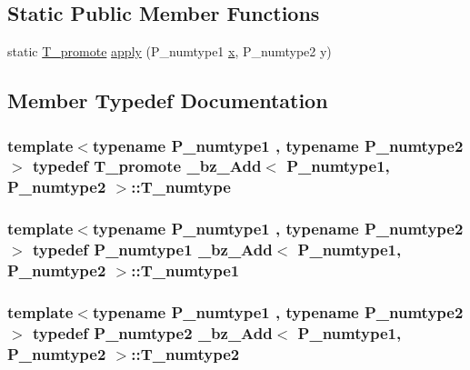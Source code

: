 \subsection*{Static Public Member Functions}
\begin{DoxyCompactItemize}
\item 
static \hyperlink{minmax_8h_aaa88a440c2f0d00798d5b1d42c79308d}{T\+\_\+promote} \hyperlink{class__bz__Add_ada860eb3b37255541a5b681bc0cea7e4}{apply} (P\+\_\+numtype1 \hyperlink{vecnorm1_8cc_ac73eed9e41ec09d58f112f06c2d6cb63}{x}, P\+\_\+numtype2 y)
\end{DoxyCompactItemize}


\subsection{Member Typedef Documentation}
\hypertarget{class__bz__Add_a8dff31e1bd85f8a25c0812c3c8ef34c5}{}
\subsubsection[{T\+\_\+numtype}]{\setlength{\rightskip}{0pt plus 5cm}template$<$typename P\+\_\+numtype1 , typename P\+\_\+numtype2 $>$ typedef {\bf T\+\_\+promote} {\bf \+\_\+bz\+\_\+\+Add}$<$ P\+\_\+numtype1, P\+\_\+numtype2 $>$\+::{\bf T\+\_\+numtype}}\label{class__bz__Add_a8dff31e1bd85f8a25c0812c3c8ef34c5}
\hypertarget{class__bz__Add_a7df5a3ad6bd933efe078b898382b5e87}{}
\subsubsection[{T\+\_\+numtype1}]{\setlength{\rightskip}{0pt plus 5cm}template$<$typename P\+\_\+numtype1 , typename P\+\_\+numtype2 $>$ typedef P\+\_\+numtype1 {\bf \+\_\+bz\+\_\+\+Add}$<$ P\+\_\+numtype1, P\+\_\+numtype2 $>$\+::{\bf T\+\_\+numtype1}}\label{class__bz__Add_a7df5a3ad6bd933efe078b898382b5e87}
\hypertarget{class__bz__Add_a3f2d47d956dab9c2bd471cb465656f54}{}
\subsubsection[{T\+\_\+numtype2}]{\setlength{\rightskip}{0pt plus 5cm}template$<$typename P\+\_\+numtype1 , typename P\+\_\+numtype2 $>$ typedef P\+\_\+numtype2 {\bf \+\_\+bz\+\_\+\+Add}$<$ P\+\_\+numtype1, P\+\_\+numtype2 $>$\+::{\bf T\+\_\+numtype2}}\label{class__bz__Add_a3f2d47d956dab9c2bd471cb465656f54}


